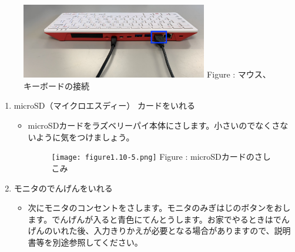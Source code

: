 \documentclass[a4paper,12pt]{jarticle}
\begin{document}
\begin{figure}[h]
  \begin{minipage}{8.135cm}
    {\upshape
      \includegraphics[width=8.135cm]{figure1.10-4.png}
      \newline
      Figure :
      マウス、キーボードの接続}
  \end{minipage}
\end{figure}
\setcounter{saveenum}{\value{enumi}}
\begin{enumerate}
  \setcounter{enumi}{\value{saveenum}}
  \clearpage
  \item
        microSD（マイクロエスディー）
        カードをいれる

        \begin{itemize}
          \item
                microSDカードをラズベリーパイ本体にさします。小さいのでなくさないように気をつけましょう。

                \begin{figure}[h]
                  \centering
                  \begin{minipage}{6.334cm}
                    {\upshape
                      \texttt{[image: figure1.10-5.png]}
                      \newline
                      Figure : microSDカードのさしこみ}
                  \end{minipage}
                \end{figure}

                \bigskip
        \end{itemize}
  \item モニタのでんげんをいれる

        \begin{itemize}
          \item
                次にモニタのコンセントをさします。モニタのみぎはじのボタンをおします。でんげんが入ると青色にてんとうします。お家でやるときはでんげんのいれた後、入力きりかえが必要となる場合がありますので、説明書等を別途参照してください。



\end{itemize}
\end{enumerate}
\end{document}
